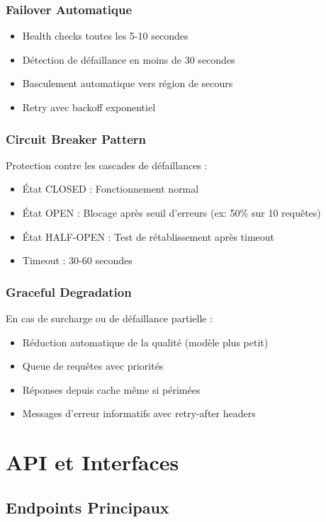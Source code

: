 \documentclass[12pt,a4paper]{article}
\begin{document}
\subsubsection{Failover Automatique}
\begin{itemize}[noitemsep]
    \item Health checks toutes les 5-10 secondes
    \item Détection de défaillance en moins de 30 secondes
    \item Basculement automatique vers région de secours
    \item Retry avec backoff exponentiel
\end{itemize}

\subsubsection{Circuit Breaker Pattern}
Protection contre les cascades de défaillances :
\begin{itemize}[noitemsep]
    \item État CLOSED : Fonctionnement normal
    \item État OPEN : Blocage après seuil d'erreurs (ex: 50\% sur 10 requêtes)
    \item État HALF-OPEN : Test de rétablissement après timeout
    \item Timeout : 30-60 secondes
\end{itemize}

\subsubsection{Graceful Degradation}
En cas de surcharge ou de défaillance partielle :
\begin{itemize}[noitemsep]
    \item Réduction automatique de la qualité (modèle plus petit)
    \item Queue de requêtes avec priorités
    \item Réponses depuis cache même si périmées
    \item Messages d'erreur informatifs avec retry-after headers
\end{itemize}

\newpage
\section{API et Interfaces}

\subsection{Endpoints Principaux}
\end{document}
